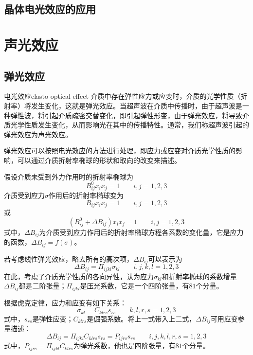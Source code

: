 \documentclass[cn,10pt,chinesefont=founder,math=mtpro2,cite=super,toc=onecol,twoside]{elegantbook}
\begin{document}
\subsection{晶体电光效应的应用}

\section{声光效应}

\subsection{弹光效应}

\begin{definition}{电光效应}{elasto-optical-effect}
	介质中存在弹性应力或应变时，介质的光学性质（折射率）将发生变化，这就是弹光效应。当超声波在介质中传播时，由于超声波是一种弹性波，将引起介质疏密交替变化，即引起弹性形变，由于弹光效应，将导致介质光学性质发生变化，从而影响光在其中的传播特性。通常，我们称超声波引起的弹光效应为声光效应。
\end{definition}

弹光效应可以按照电光效应的方法进行处理，即应力或应变对介质光学性质的影响，可以通过介质折射率椭球的形状和取向的改变来描述。

假设介质未受到外力作用时的折射率椭球为
\begin{equation}
B^0_{ij}x_ix_j=1\qquad i,j=1,2,3
\end{equation}
介质受到应力$\sigma$作用后的折射率椭球变为
\begin{equation}
B_{ij}x_ix_j=1\qquad i,j=1,2,3
\end{equation}
或
\begin{equation}
(B^0_{ij}+\Delta B_{ij})x_ix_j=1\qquad i,j=1,2,3
\end{equation}
式中，$\Delta B_{ij}$为介质受到应力作用后的折射率椭球方程各系数的变化量，它是应力的函数，$\Delta B_{ij}=f(\sigma)$。

若考虑线性弹光效应，略去所有的高次项，$\Delta B_{ij}$可以表示为
\begin{equation}
\Delta B_{ij}=\varPi_{ijkl}\sigma_{kl}\qquad i,j,k,l=1,2,3
\end{equation}
在此，考虑了介质光学性质的各向异性，认为应力$\sigma_{kl}$和折射率椭球的系数增量$\Delta B_{ij}$都是二阶张量；$\varPi_{ijkl}$是压光系数，它是一个四阶张量，有$81$个分量。

根据虎克定律，应力和应变有如下关系：
\begin{equation}
\sigma_{kl}=C_{klrs}s_{rs}\qquad k,l,r,s=1,2,3
\end{equation}
式中，$s_{rs}$是弹性应变；$C_{klrs}$是倔强系数。将上一式带入上二式，$\Delta B_{ij}$可用应变参量描述：
\begin{equation}
\Delta B_{ij}=\varPi_{ijkl}C_{klrs}s_{rs}=P_{ijrs}s_{rs}\qquad i,j,k,l,r,s=1,2,3
\end{equation}
式中，$P_{ijrs}=\varPi_{ijkl}C_{klrs}$为弹光系数，他也是四阶张量，有$81$个分量。
\end{document}
